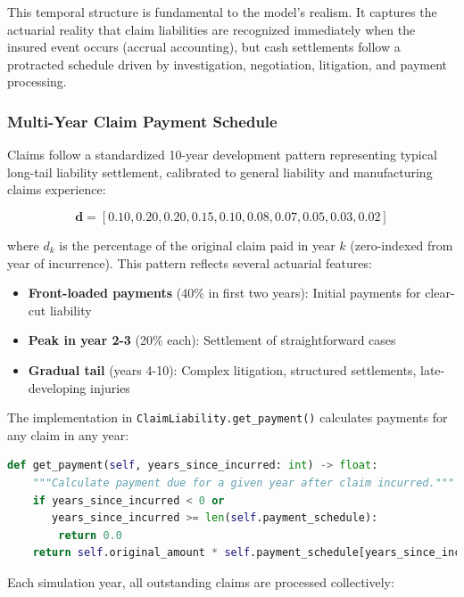 \documentclass[11pt,letterpaper]{article}
\begin{document}
This temporal structure is fundamental to the model's realism. It captures the actuarial reality that claim liabilities are recognized immediately when the insured event occurs (accrual accounting), but cash settlements follow a protracted schedule driven by investigation, negotiation, litigation, and payment processing.

\subsubsection{Multi-Year Claim Payment Schedule}
\label{alg:claim-payments}

Claims follow a standardized 10-year development pattern representing typical long-tail liability settlement, calibrated to general liability and manufacturing claims experience:

\begin{equation}
\mathbf{d} = [0.10, 0.20, 0.20, 0.15, 0.10, 0.08, 0.07, 0.05, 0.03, 0.02]
\end{equation}

where $d_k$ is the percentage of the original claim paid in year $k$ (zero-indexed from year of incurrence). This pattern reflects several actuarial features:
\begin{itemize}
    \item \textbf{Front-loaded payments} (40\% in first two years): Initial payments for clear-cut liability
    \item \textbf{Peak in year 2-3} (20\% each): Settlement of straightforward cases
    \item \textbf{Gradual tail} (years 4-10): Complex litigation, structured settlements, late-developing injuries
\end{itemize}

The implementation in \texttt{ClaimLiability.get\_payment()} calculates payments for any claim in any year:

\begin{lstlisting}[language=Python, caption={Claim Payment Calculation}, label={lst:claim-payment}]
def get_payment(self, years_since_incurred: int) -> float:
    """Calculate payment due for a given year after claim incurred."""
    if years_since_incurred < 0 or
       years_since_incurred >= len(self.payment_schedule):
        return 0.0
    return self.original_amount * self.payment_schedule[years_since_incurred]
\end{lstlisting}

Each simulation year, all outstanding claims are processed collectively:
\end{document}
